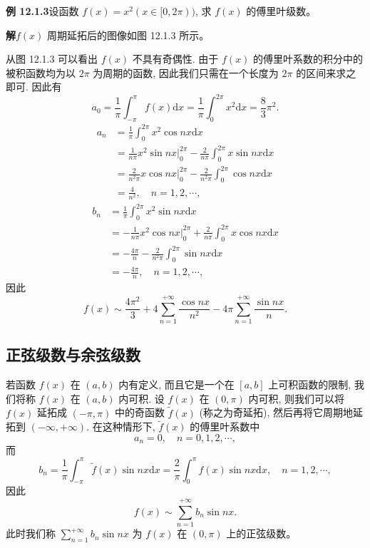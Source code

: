 \documentclass[UTF8,12pt,a4paper,fontset=fandol]{ctexart}
\begin{document}
\noindent\textbf{例 12.1.3}\quad 设函数 $f(x)=x^2(x\in[0,2\pi))$, 求 $f(x)$ 的傅里叶级数。

\noindent\textbf{解}\quad $f(x)$ 周期延拓后的图像如图 12.1.3 所示。

从图 12.1.3 可以看出 $f(x)$ 不具有奇偶性. 由于 $f(x)$ 的傅里叶系数的积分中的被积函数均为以 $2\pi$ 为周期的函数, 因此我们只需在一个长度为 $2\pi$ 的区间来求之即可. 因此有
\[
  a_0=\frac1\pi\int_{-\pi}^{\pi}f(x)\mathrm dx
  =\frac1\pi\int_0^{2\pi}x^2\mathrm dx
  =\frac83\pi^2.
\]
\[
\begin{aligned}
  a_n
  &=\frac1\pi\int_0^{2\pi}x^2\cos nx\mathrm dx\\
  &=\frac1{n\pi}x^2\sin nx\bigg|_0^{2\pi}
    -\frac2{n\pi}\int_0^{2\pi}x\sin nx\mathrm dx\\
  &=\frac2{n^2\pi}x\cos nx\bigg|_0^{2\pi}
    -\frac2{n^2\pi}\int_0^{2\pi}\cos nx\mathrm dx\\
  &=\frac4{n^2},\quad n=1,2,\cdots,
\end{aligned}
\]
\[
\begin{aligned}
  b_n
  &=\frac1\pi\int_0^{2\pi}x^2\sin nx\mathrm dx\\
  &=-\frac1{n\pi}x^2\cos nx\bigg|_0^{2\pi}
    +\frac2{n\pi}\int_0^{2\pi}x\cos nx\mathrm dx\\
  &=-\frac{4\pi}{n}-\frac2{n^2\pi}\int_0^{2\pi}\sin nx\mathrm dx\\
  &=-\frac{4\pi}{n},\quad n=1,2,\cdots,
\end{aligned}
\]
因此
\[
  f(x)\sim\frac{4\pi^2}{3}
  +4\sum_{n=1}^{+\infty}\frac{\cos nx}{n^2}
  -4\pi\sum_{n=1}^{+\infty}\frac{\sin nx}{n}.
\]

\subsection{正弦级数与余弦级数}

若函数 $f(x)$ 在 $(a,b)$ 内有定义, 而且它是一个在 $[a,b]$ 上可积函数的限制, 我们将称 $f(x)$ 在 $(a,b)$ 内可积. 设 $f(x)$ 在 $(0,\pi)$ 内可积, 则我们可以将 $f(x)$ 延拓成 $(-\pi,\pi)$ 中的奇函数 $\widetilde f(x)$ (称之为奇延拓), 然后再将它周期地延拓到 $(-\infty,+\infty)$. 在这种情形下, $\widetilde f(x)$ 的傅里叶系数中
\[
  a_n=0,\quad n=0,1,2,\cdots,
\]
而
\[
  b_n=\frac1\pi\int_{-\pi}^{\pi}\widetilde f(x)\sin nx\mathrm dx
  =\frac2\pi\int_0^\pi f(x)\sin nx\mathrm dx,\quad n=1,2,\cdots,
\]
因此
\[
  f(x)\sim\sum_{n=1}^{+\infty}b_n\sin nx.
\]
此时我们称 $\sum\limits_{n=1}^{+\infty}b_n\sin nx$ 为 $f(x)$ 在 $(0,\pi)$ 上的正弦级数。
\end{document}
